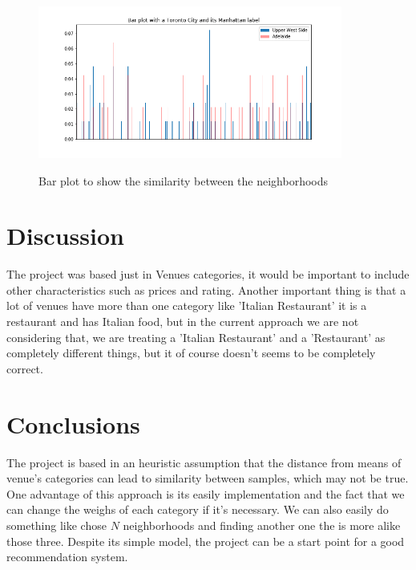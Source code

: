 \documentclass{article}
\begin{document}
\begin{figure}[h!]
	\includegraphics[width=10cm]{comparassion_plot.png}
	\label{comp_plot}
	\caption{Bar plot to show the similarity between the neighborhoods}
\end{figure}

\section{Discussion}
The project was based just in Venues categories, it would be important to include other characteristics such as  prices and rating. Another important thing is that a lot of venues have more than one category like 'Italian Restaurant' it is a restaurant and has Italian food, but in the current approach we are not considering that, we are  treating a 'Italian Restaurant' and a 'Restaurant' as completely different things, but it of course doesn't seems to be completely correct.   

\section{Conclusions}
The project is based in an heuristic assumption that the distance from means of venue's categories can lead to similarity between samples, which may not be true. One advantage of this approach is its easily implementation and the fact that we can change the weighs of each category if it's necessary. We can also easily do something like chose $N$ neighborhoods and finding another one the is more alike those three. Despite its simple model, the project can be a start point for a good recommendation system.
\end{document}

